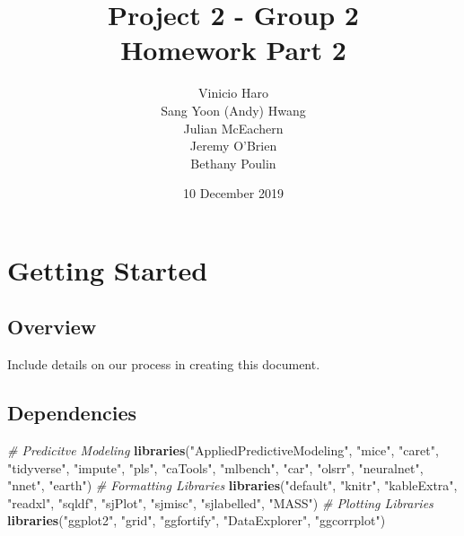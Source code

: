 \documentclass[]{report}
\title{Project 2 - Group 2\\
Homework Part 2}
\author{Vinicio Haro \\ Sang Yoon (Andy) Hwang \\ Julian McEachern \\ Jeremy O'Brien \\ Bethany Poulin}
\date{10 December 2019}
\newenvironment{Shaded}{\begin{snugshade}}{\end{snugshade}}
\newcommand{\CommentTok}[1]{\textcolor[rgb]{0.56,0.35,0.01}{\textit{#1}}}
\newcommand{\KeywordTok}[1]{\textcolor[rgb]{0.13,0.29,0.53}{\textbf{#1}}}
\newcommand{\NormalTok}[1]{#1}
\newcommand{\StringTok}[1]{\textcolor[rgb]{0.31,0.60,0.02}{#1}}
\begin{document}
\maketitle

{
\setcounter{tocdepth}{2}
\tableofcontents
}
\hypertarget{Overview}{%
\chapter*{Getting Started}\label{Overview}}

\hypertarget{overview}{%
\section{Overview}\label{overview}}

Include details on our process in creating this document.

\hypertarget{dependencies}{%
\section{Dependencies}\label{dependencies}}

\begin{Shaded}
\begin{Highlighting}[]
\CommentTok{# Predicitve Modeling}
\KeywordTok{libraries}\NormalTok{(}\StringTok{"AppliedPredictiveModeling"}\NormalTok{, }\StringTok{"mice"}\NormalTok{, }\StringTok{"caret"}\NormalTok{, }\StringTok{"tidyverse"}\NormalTok{, }
    \StringTok{"impute"}\NormalTok{, }\StringTok{"pls"}\NormalTok{, }\StringTok{"caTools"}\NormalTok{, }\StringTok{"mlbench"}\NormalTok{, }\StringTok{"car"}\NormalTok{, }\StringTok{"olsrr"}\NormalTok{, }\StringTok{"neuralnet"}\NormalTok{, }
    \StringTok{"nnet"}\NormalTok{, }\StringTok{"earth"}\NormalTok{)}
\CommentTok{# Formatting Libraries}
\KeywordTok{libraries}\NormalTok{(}\StringTok{"default"}\NormalTok{, }\StringTok{"knitr"}\NormalTok{, }\StringTok{"kableExtra"}\NormalTok{, }\StringTok{"readxl"}\NormalTok{, }\StringTok{"sqldf"}\NormalTok{, }
    \StringTok{"sjPlot"}\NormalTok{, }\StringTok{"sjmisc"}\NormalTok{, }\StringTok{"sjlabelled"}\NormalTok{, }\StringTok{"MASS"}\NormalTok{)}
\CommentTok{# Plotting Libraries}
\KeywordTok{libraries}\NormalTok{(}\StringTok{"ggplot2"}\NormalTok{, }\StringTok{"grid"}\NormalTok{, }\StringTok{"ggfortify"}\NormalTok{, }\StringTok{"DataExplorer"}\NormalTok{, }\StringTok{"ggcorrplot"}\NormalTok{)}
\end{Highlighting}
\end{Shaded}
\end{document}
